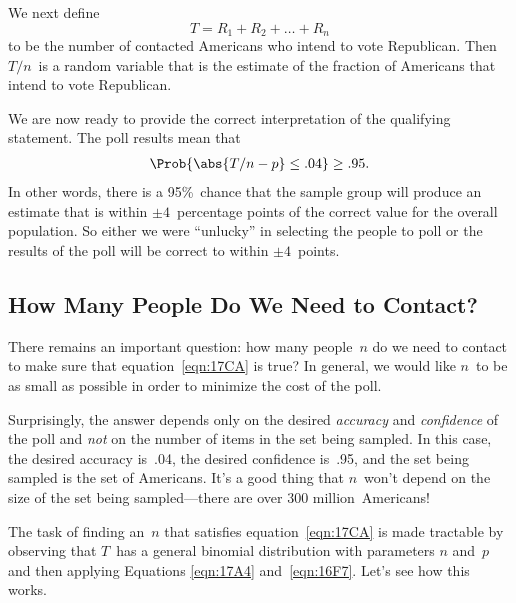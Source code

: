 \begin{editingnotes}
We next define
\begin{equation*}
    T = R_1 + R_2 + \dots + R_n
\end{equation*}
to be the number of contacted Americans who intend to vote
Republican.  Then $T/n$~is a random variable that is the estimate of
the fraction of Americans that intend to vote Republican.

We are now ready to provide the correct interpretation of the
qualifying statement.  The poll results mean that
\begin{equation}\label{eqn:17CA}
    \Prob{\strut \abs{T/n - p} \le .04} \ge .95.
\end{equation}
In other words, there is a 95\%~chance that the sample group will
produce an estimate that is within $\pm 4$~percentage points of the
correct value for the overall population.  So either we were
``unlucky'' in selecting the people to poll or the results of the poll
will be correct to within $\pm 4$~points.

\subsection{How Many People Do We Need to Contact?}

There remains an important question: how many people~$n$ do we need to
contact to make sure that equation~\eqref{eqn:17CA} is true?  In
general, we would like $n$~to be as small as possible in order to
minimize the cost of the poll.

Surprisingly, the answer depends only on the desired \emph{accuracy}
and \emph{confidence} of the poll and \emph{not} on the number of
items in the set being sampled.  In this case, the desired accuracy
is~.04, the desired confidence is~.95, and the set being sampled is
the set of Americans.  It's a good thing that $n$~won't depend on the
size of the set being sampled---there are over 300 million~Americans!

The task of finding an~$n$ that satisfies equation~\eqref{eqn:17CA} is
made tractable by observing that $T$~has a general binomial
distribution with parameters $n$ and~$p$ and then applying Equations
\ref{eqn:17A4} and~\ref{eqn:16F7}.  Let's see how this works.


\end{editingnotes}
